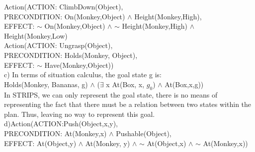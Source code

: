 \documentclass[11pt]{article}
\begin{document}
\begin{enumerate}
Action(ACTION: ClimbDown(Object), \\
PRECONDITION: On(Monkey,Object) $\wedge$ Height(Monkey,High), \\
EFFECT: $\sim$ On(Monkey,Object) $\wedge$ $\sim$ Height(Monkey,High) $\wedge$ Height(Monkey,Low) \\

Action(ACTION: Ungrasp(Object), \\ 
PRECONDITION: Holds(Monkey, Object),\\
EFFECT: $\sim$ Have(Monkey,Object))\\

c) In terms of situation calculus, the goal state g is: \\
Holds(Monkey, Bananas, g) $\wedge$ ($\exists$ x At(Box, x, $g_0$) $\wedge$ At(Box,x,g))\\
In STRIPS, we can only represent the goal state, there is no means of representing the fact that there must be a relation between two states within the plan. Thus, leaving no way to represent this goal. \\

d)Action(ACTION:Push(Object,x,y), \\
PRECONDITION: At(Monkey,x) $\wedge$ Pushable(Object), \\
EFFECT: At(Object,y) $\wedge$ At(Monkey, y) $\wedge$ $\sim$ At(Object,x) $\wedge$ $\sim$ At(Monkey,x))
\end{enumerate}
\end{document}
